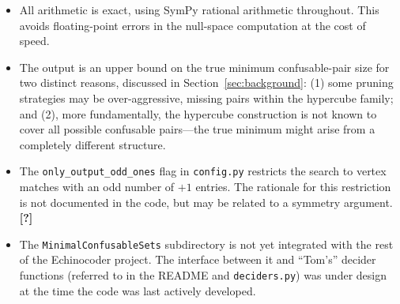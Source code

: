 \documentclass[12pt,a4paper]{article}
\begin{document}
\begin{itemize}
  \item All arithmetic is exact, using SymPy rational arithmetic throughout.
    This avoids floating-point errors in the null-space computation at the cost
    of speed.

  \item The output is an upper bound on the true minimum confusable-pair size
    for two distinct reasons, discussed in Section~\ref{sec:background}: (1)
    some pruning strategies may be over-aggressive, missing pairs within the
    hypercube family; and (2), more fundamentally, the hypercube construction
    is not known to cover all possible confusable pairs---the true minimum
    might arise from a completely different structure.

  \item The \texttt{only\_output\_odd\_ones} flag in \texttt{config.py}
    restricts the search to vertex matches with an odd number of $+1$ entries.
    The rationale for this restriction is not documented in the code, but may
    be related to a symmetry argument. \textbf{[?]}

  \item The \texttt{MinimalConfusableSets} subdirectory is not yet integrated
    with the rest of the Echinocoder project. The interface between it and
    ``Tom's'' decider functions (referred to in the README and
    \texttt{deciders.py}) was under design at the time the code was last
    actively developed.
\end{itemize}
\end{document}
